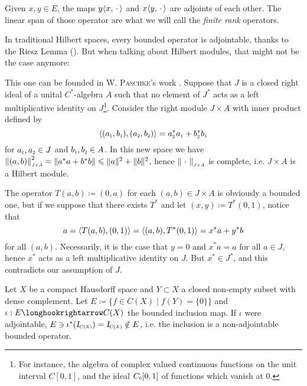 \begin{exemplo}
    \label{exemplo:finite rank}
    Given $x,y \in E$, the maps $y\langle {x},{\operatorname{\,\cdot\,}}\rangle$ and $x\langle {y},{\operatorname{\,\cdot\,}}\rangle$ are adjoints of each other. The linear span of those operator are what we will call the \textit{finite rank} operators.
\end{exemplo}
    
In traditional Hilbert spaces, every bounded operator is adjointable, thanks to the Riesz Lemma (\cite[Theorem II.4]{reed2012methods}). But when talking about Hilbert modules, that might not be the case anymore:
    
\begin{contraexemplo} \label{contraexemplo: paschke non adjointable}
    This one can be founded in \textsc{W. Paschke}'s work \cite[Remark 2.5]{paschke1973inner}. Suppose that $J$ is a closed right ideal of a unital $C^{*}$-algebra $A$ such that no element of $J^{*}$ acts as a left multiplicative identity on $J$\footnote{For instance, the algebra of complex valued continuous functions on the unit interval $C[0,1]$, and the ideal $\sub C0[0,1]$ of functions which vanish at 0.}. Consider the right module $J \times A$ with inner product defined by 
    \begin{equation*}
    \inner{\left(\sub a{1}, \sub b{1}\right)}{\left(\sub a{2}, \sub b{2}\right)} = \sub a{2}^{*} \sub a{1}+\sub b{2}^{*} \sub b{1}
    \end{equation*}
    for $\sub a1, \sub a2 \in J$ and $\sub b1, \sub b2 \in A$. In this new space we have $\sub{\|(a, b)\|}{J\times A}^2=\left\|a^{*} a+b^* b\right\|\leq \|a\|^{2}+\|b\|^{2}$, hence $\sub{\|\come\|}{J\times A}$ is complete, i.e. $J\times A$ is a Hilbert module. 
    
    The operator $T(a,b)\coloneqq (0,a)$ for each $(a,b) \in J\times A$ is obviously a bounded one, but if we suppose that there exists $T^*$ and let $(x,y) \coloneqq T^*(0,1)$, notice that
    \begin{equation*}
        a = \langle {T(a,b)},{(0,1)}\rangle = \langle {(a,b)},{T^*(0,1)}\rangle = x^*a+y^*b
    \end{equation*}
    for all $(a,b)$. Necessarily, it is the case that $y=0$ and $x^*a=a$ for all $a\in J$, hence $x^*$ acts as a left multiplicative identity on $J$. But $x^* \in J^*$, and this contradicts our assumption of $J$.
\end{contraexemplo}
    
\begin{contraexemplo}
    Let $X$ be a compact Hausdorff space and $Y \subset X$ a closed non-empty subset with dense complement. Let $E \coloneqq \big\{f \in C(X) \mid f(Y) = \{0\}\big\}$ and $\iota : E \longhookrightarrow C(X)$ the bounded inclusion map. If $\iota$ were adjointable, $E \ni \iota^*(\sub\Id{C(X)}) = \sub\Id{C(X)} \notin E$, i.e. the inclusion is a non-adjointable bounded operator.
\end{contraexemplo}
        
